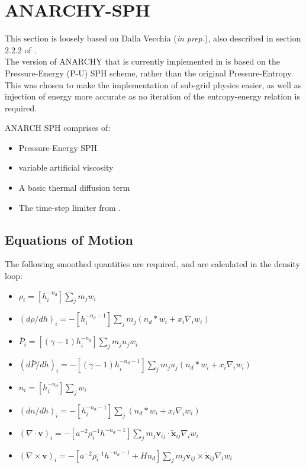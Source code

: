 \section{ANARCHY-SPH}
\label{sec:sph:anarchy}

This section is loosely based on Dalla Vecchia (\textit{in prep.}), also described in section 2.2.2 of
\cite{Schaller2015}.\\

The version of ANARCHY that is currently implemented in \swift{} is based on the Pressure-Energy
(P-U) SPH scheme, rather than the original Pressure-Entropy. This was chosen to make the
implementation of sub-grid physics easier, as well as injection of energy more accurate as
no iteration of the entropy-energy relation is required.

ANARCH SPH comprises of:
\begin{itemize}
	\item Pressure-Energy SPH
	\item \citet[][, henceforth C\&D]{cullen2010} variable artificial viscosity
	\item A basic thermal diffusion term
	\item The time-step limiter from \citet{durier2012}.
\end{itemize}

\subsection{Equations of Motion}

The following smoothed quantities are required, and are calculated in the density loop:
\begin{itemize}
	\item $\rho_i = [h_i^{-n_d}]\sum_j m_j w_{i}$
	\item $(d\rho/dh)_i = - [h_i^{-n_d - 1}]\sum_j m_j ( n_d * w_i + x_i \nabla_i w_i)$
	\item $\bar{P}_i = [(\gamma - 1)h_i^{-n_d}]\sum_j m_j u_j w_{i}$
	\item $(d\bar{P}/dh)_i = - [(\gamma - 1)h_i^{-n_d - 1}]\sum_j m_j u_j ( n_d * w_i + x_i \nabla_i w_i)$
	\item $n_i = [h_i^{-n_d}]\sum_j w_{i}$
	\item $(dn/dh)_i = - [h_i^{-n_d - 1}]\sum_j ( n_d * w_i + x_i \nabla_i w_i)$
	\item $(\nabla \cdot \mathbf{v})_i = - [a^{-2} \rho_i^{-1} h^{-n_d - 1}]\sum_j m_j \mathbf{v}_{ij} \cdot \tilde{\mathbf{x}}_{ij} \nabla_i w_i$
	\item $(\nabla \times \mathbf{v})_i = - [a^{-2} \rho_i^{-1} h^{-n_d - 1} + Hn_d]\sum_j m_j \mathbf{v}_{ij} \times \tilde{\mathbf{x}}_{ij} \nabla_i w_i$
\end{itemize}


